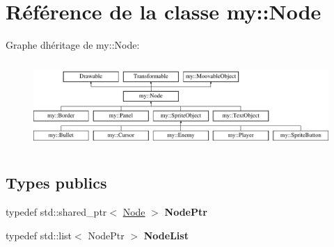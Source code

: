 \hypertarget{classmy_1_1Node}{}\section{Référence de la classe my\+:\+:Node}
\label{classmy_1_1Node}
Graphe d\textquotesingle{}héritage de my\+:\+:Node\+:\begin{figure}[H]
\begin{center}
\leavevmode
\includegraphics[height=3.318518cm]{classmy_1_1Node}
\end{center}
\end{figure}
\subsection*{Types publics}
\begin{DoxyCompactItemize}
\item 
\mbox{\label{classmy_1_1Node_a84da714a586798cd894654ca825e0211}} 
typedef std\+::shared\+\_\+ptr$<$ \hyperlink{classmy_1_1Node}{Node} $>$ {\bfseries Node\+Ptr}
\item 
\mbox{\label{classmy_1_1Node_a6232a3681184c2ed92028994c619bcf6}} 
typedef std\+::list$<$ Node\+Ptr $>$ {\bfseries Node\+List}
\end{DoxyCompactItemize}
